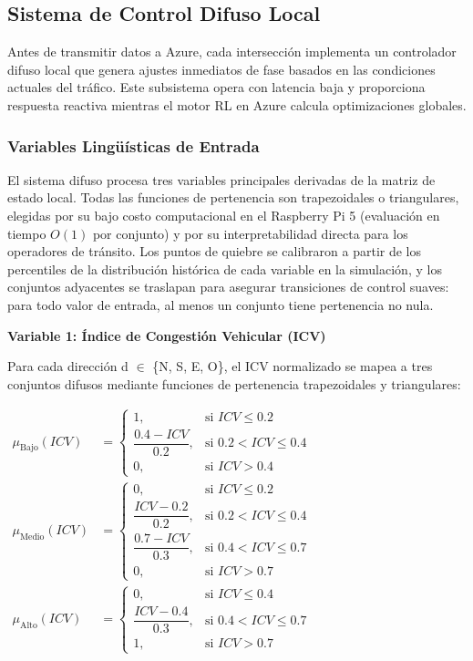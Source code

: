 \documentclass[12pt,a4paper,oneside]{report}
\newenvironment{centeredmath}
  {\begin{center}\begin{adjustbox}{max width=0.96\linewidth}\(\displaystyle}
  {\)\end{adjustbox}\end{center}}
\begin{document}
\subsection{Sistema de Control Difuso Local}\label{sistema-de-control-difuso-local}

Antes de transmitir datos a Azure, cada intersección implementa un controlador difuso local que genera ajustes inmediatos de fase basados en las condiciones actuales del tráfico. Este subsistema opera con latencia baja y proporciona respuesta reactiva mientras el motor RL en Azure calcula optimizaciones globales.

\subsubsection{Variables Lingüísticas de Entrada}

El sistema difuso procesa tres variables principales derivadas de la matriz de estado local. Todas las funciones de pertenencia son trapezoidales o triangulares, elegidas por su bajo costo computacional en el Raspberry Pi 5 (evaluación en tiempo \(O(1)\) por conjunto) y por su interpretabilidad directa para los operadores de tránsito. Los puntos de quiebre se calibraron a partir de los percentiles de la distribución histórica de cada variable en la simulación, y los conjuntos adyacentes se traslapan para asegurar transiciones de control suaves: para todo valor de entrada, al menos un conjunto tiene pertenencia no nula.

\textbf{Variable 1: Índice de Congestión Vehicular (ICV)}

Para cada dirección d \ensuremath{\in} \{N, S, E, O\}, el ICV normalizado se mapea a tres conjuntos difusos mediante funciones de pertenencia trapezoidales y triangulares:
\begin{centeredmath}
\begin{aligned}
\mu_{\text{Bajo}}(ICV)
&=
\begin{cases}
1, & \text{si } ICV \le 0.2\\
\dfrac{0.4-ICV}{0.2}, & \text{si } 0.2 < ICV \le 0.4\\
0, & \text{si } ICV > 0.4
\end{cases}\\[1em]
\mu_{\text{Medio}}(ICV)
&=
\begin{cases}
0, & \text{si } ICV \le 0.2\\
\dfrac{ICV-0.2}{0.2}, & \text{si } 0.2 < ICV \le 0.4\\
\dfrac{0.7-ICV}{0.3}, & \text{si } 0.4 < ICV \le 0.7\\
0, & \text{si } ICV > 0.7
\end{cases}\\[1em]
\mu_{\text{Alto}}(ICV)
&=
\begin{cases}
0, & \text{si } ICV \le 0.4\\
\dfrac{ICV-0.4}{0.3}, & \text{si } 0.4 < ICV \le 0.7\\
1, & \text{si } ICV > 0.7
\end{cases}
\end{aligned}
\end{centeredmath}
\end{document}
